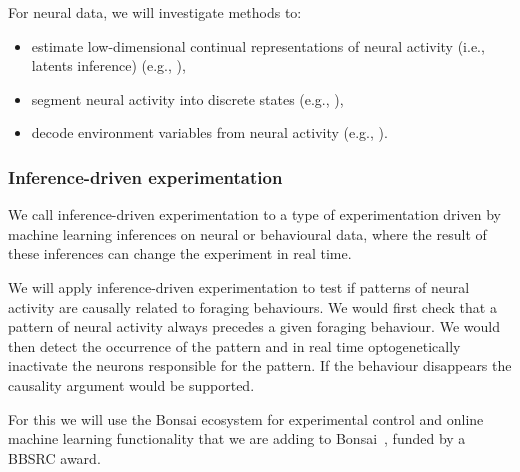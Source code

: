 For neural data, we will investigate methods to:

\begin{itemize}

    \item estimate low-dimensional continual representations of neural activity
        (i.e., latents inference) (e.g., \cite{mackeEtAl11}),

    \item segment neural activity into discrete states (e.g.,
        \cite{escolaEtAl11}),

    \item decode environment variables from neural activity (e.g.,
        \cite{dengEtAl15}).

\end{itemize}

\subsubsection{Inference-driven experimentation}

We call inference-driven experimentation to a type of experimentation driven by
machine learning inferences on neural or behavioural data, where the result of
these inferences can change the experiment in real time.

We will apply inference-driven experimentation to test if patterns of neural
activity are causally related to foraging behaviours.
%
We would first check that a pattern of neural activity always precedes a given
foraging behaviour. We would then detect the occurrence of the pattern and in
real time optogenetically inactivate the neurons responsible for the pattern.
%
If the behaviour disappears the causality argument would be supported.

For this we will use the Bonsai ecosystem for experimental
control and online machine learning functionality that we are
adding to Bonsai~\cite{bonsaiML}, funded by a BBSRC award.

